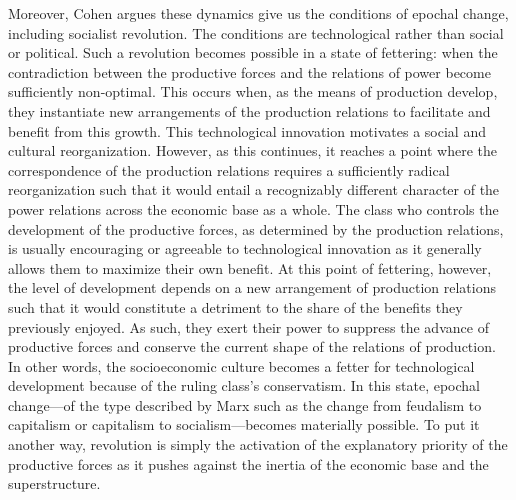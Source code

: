 \documentclass[letterpaper,notitlepage,12pt]{article}
\begin{document}
Moreover, Cohen argues these dynamics give us the conditions of epochal change,
including socialist revolution.
The conditions are technological rather than social or political.
Such a revolution becomes possible in a state of fettering: when the
contradiction between the productive forces and the relations of power become
sufficiently non-optimal.
This occurs when, as the means of production develop, they instantiate new
arrangements of the production relations to facilitate and benefit from this
growth.
This technological innovation motivates a social and cultural reorganization.
However, as this continues, it reaches a point where the correspondence of the
production relations requires a sufficiently radical reorganization such that it
would entail a recognizably different character of the power relations across
the economic base as a whole.
The class who controls the development of the productive forces, as determined
by the production relations, is usually encouraging or agreeable to
technological innovation as it generally allows them to maximize their own
benefit.
At this point of fettering, however, the level of development depends on a new
arrangement of production relations such that it would constitute a detriment to
the share of the benefits they previously enjoyed.
As such, they exert their power to suppress the advance of productive forces and
conserve the current shape of the relations of production.
In other words, the socioeconomic culture becomes a fetter for technological
development because of the ruling class's conservatism.
In this state, epochal change---of the type described by Marx such as the change
from feudalism to capitalism or capitalism to socialism---becomes materially
possible.
To put it another way, revolution is simply the activation of the explanatory
priority of the productive forces as it pushes against the inertia of the
economic base and the superstructure.
\end{document}
